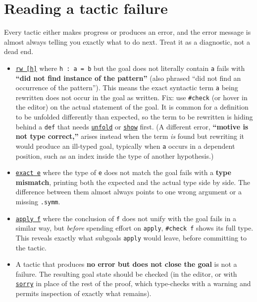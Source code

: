 \section{Reading a tactic failure}\label{sec:04-tactics:03-reading-failures:1}

Every tactic either makes progress or produces an error, and the error message is almost always telling you exactly what to do next. Treat it as a diagnostic, not a dead end.

\begin{itemize}
\tightlist
\item
  \href{https://lean-lang.org/doc/reference/latest/Tactic-Proofs/Tactic-Reference/}{\texttt{rw [h]}} where \texttt{h : a = b} but the goal does not literally contain \texttt{a} fails with \textbf{``did not find instance of the pattern''} (also phrased ``did not find an occurrence of the pattern''). This means the exact syntactic term \texttt{a} being rewritten does not occur in the goal as written. Fix: use \texttt{\#check} (or hover in the editor) on the actual statement of the goal. It is common for a definition to be unfolded differently than expected, so the term to be rewritten is hiding behind a \texttt{def} that needs \href{https://lean-lang.org/doc/reference/latest/Tactic-Proofs/Tactic-Reference/}{\texttt{unfold}} or \href{https://lean-lang.org/doc/reference/latest/Tactic-Proofs/Tactic-Reference/}{\texttt{show}} first. (A different error, \textbf{``motive is not type correct,''} arises instead when the term \emph{is} found but rewriting it would produce an ill-typed goal, typically when \texttt{a} occurs in a dependent position, such as an index inside the type of another hypothesis.)
\item
  \href{https://lean-lang.org/doc/reference/latest/Tactic-Proofs/Tactic-Reference/}{\texttt{exact e}} where the type of \texttt{e} does not match the goal fails with a \textbf{type mismatch}, printing both the expected and the actual type side by side. The difference between them almost always points to one wrong argument or a missing \texttt{.symm}.
\item
  \href{https://lean-lang.org/doc/reference/latest/Tactic-Proofs/Tactic-Reference/}{\texttt{apply f}} where the conclusion of \texttt{f} does not unify with the goal fails in a similar way, but \emph{before} spending effort on \texttt{apply}, \texttt{\#check f} shows its full type. This reveals exactly what subgoals \texttt{apply} would leave, before committing to the tactic.
\item
  A tactic that produces \textbf{no error but does not close the goal} is not a failure. The resulting goal state should be checked (in the editor, or with \href{https://lean-lang.org/doc/reference/latest/Tactic-Proofs/Tactic-Reference/}{\texttt{sorry}} in place of the rest of the proof, which type-checks with a warning and permits inspection of exactly what remains).
\end{itemize}

